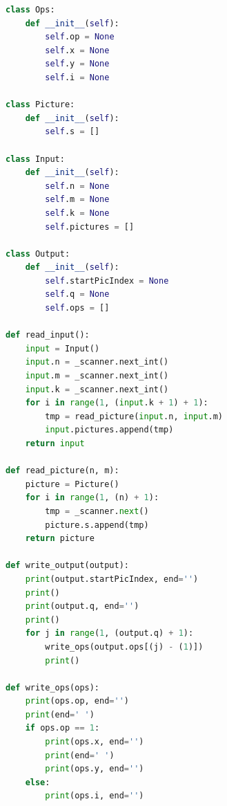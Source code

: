 \documentclass[times,specification,annotation]{style/itmo-student-thesis/itmo-student-thesis}
\begin{document}
\begin{lstlisting}[caption={Часть сгенерированного кода грейдера на языке Python},label={gen-grader-python},language=Python]
class Ops:
    def __init__(self):
        self.op = None
        self.x = None
        self.y = None
        self.i = None

class Picture:
    def __init__(self):
        self.s = []

class Input:
    def __init__(self):
        self.n = None
        self.m = None
        self.k = None
        self.pictures = []

class Output:
    def __init__(self):
        self.startPicIndex = None
        self.q = None
        self.ops = []

def read_input():
    input = Input()
    input.n = _scanner.next_int()
    input.m = _scanner.next_int()
    input.k = _scanner.next_int()
    for i in range(1, (input.k + 1) + 1):
        tmp = read_picture(input.n, input.m)
        input.pictures.append(tmp)
    return input

def read_picture(n, m):
    picture = Picture()
    for i in range(1, (n) + 1):
        tmp = _scanner.next()
        picture.s.append(tmp)
    return picture

def write_output(output):
    print(output.startPicIndex, end='')
    print()
    print(output.q, end='')
    print()
    for j in range(1, (output.q) + 1):
        write_ops(output.ops[(j) - (1)])
        print()

def write_ops(ops):
    print(ops.op, end='')
    print(end=' ')
    if ops.op == 1:
        print(ops.x, end='')
        print(end=' ')
        print(ops.y, end='')
    else:
        print(ops.i, end='')
\end{lstlisting}
\end{document}
